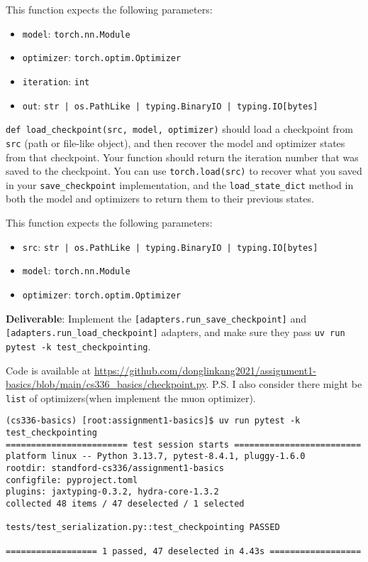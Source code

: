 This function expects the following parameters:
\begin{itemize}
    \item \texttt{model}: \texttt{torch.nn.Module}
    \item \texttt{optimizer}: \texttt{torch.optim.Optimizer}
    \item \texttt{iteration}: \texttt{int}
    \item \texttt{out}: \texttt{str | os.PathLike | typing.BinaryIO | typing.IO[bytes]}
\end{itemize}

\texttt{def load\_checkpoint(src, model, optimizer)} should load a checkpoint from \texttt{src} (path or file-like object), and then recover the model and optimizer states from that checkpoint. Your function should return the iteration number that was saved to the checkpoint. You can use \texttt{torch.load(src)} to recover what you saved in your \texttt{save\_checkpoint} implementation, and the \texttt{load\_state\_dict} method in both the model and optimizers to return them to their previous states.

This function expects the following parameters:
\begin{itemize}
    \item \texttt{src}: \texttt{str | os.PathLike | typing.BinaryIO | typing.IO[bytes]}
    \item \texttt{model}: \texttt{torch.nn.Module}
    \item \texttt{optimizer}: \texttt{torch.optim.Optimizer}
\end{itemize}

\textbf{Deliverable}: Implement the \lstinline{[adapters.run_save_checkpoint]} and \lstinline{[adapters.run_load_checkpoint]} adapters, and make sure they pass \lstinline{uv run pytest -k test_checkpointing}.

\begin{answer}
Code is available at \url{https://github.com/donglinkang2021/assignment1-basics/blob/main/cs336_basics/checkpoint.py}. P.S. I also consider there might be \lstinline{list} of optimizers(when implement the muon optimizer).
\end{answer}

\begin{lstlisting}
(cs336-basics) [root:assignment1-basics]$ uv run pytest -k test_checkpointing
======================== test session starts =========================
platform linux -- Python 3.13.7, pytest-8.4.1, pluggy-1.6.0
rootdir: standford-cs336/assignment1-basics
configfile: pyproject.toml
plugins: jaxtyping-0.3.2, hydra-core-1.3.2
collected 48 items / 47 deselected / 1 selected                      

tests/test_serialization.py::test_checkpointing PASSED

================== 1 passed, 47 deselected in 4.43s ==================
\end{lstlisting}

